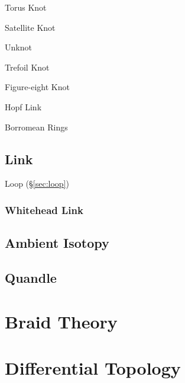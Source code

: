 Torus Knot

Satellite Knot



Unknot

Trefoil Knot

Figure-eight Knot

Hopf Link

Borromean Rings



\subsection{Link} \label{sec:link}

Loop (\S\ref{sec:loop})



\subsubsection{Whitehead Link} \label{sec:whitehead_link}



\subsection{Ambient Isotopy} \label{sec:ambient_isotopy}

\subsection{Quandle} \label{sec:quandle}



\section{Braid Theory} \label{sec:braid_theory}

\section{Differential Topology}\label{sec:differential_topology}

